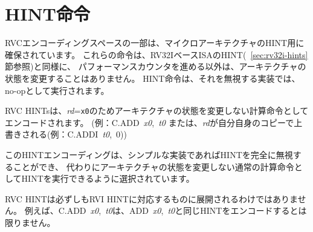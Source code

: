 \section{HINT命令}
\label{sec:rvc-hints}

\begin{comment}
A portion of the RVC encoding space is reserved for microarchitectural HINTs.
Like the HINTs in the RV32I base ISA (see Section~\ref{sec:rv32i-hints}),
these instructions do not modify any architectural state, except for advancing
the {\tt pc} and any applicable performance counters.  HINTs are
executed as no-ops on implementations that ignore them.
\end{comment}
RVCエンコーディングスペースの一部は、マイクロアーキテクチャのHINT用に確保されています。
これらの命令は、RV32IベースISAのHINT(~\ref{sec:rv32i-hints}節参照)と同様に、
パフォーマンスカウンタを進める以外は、アーキテクチャの状態を変更することはありません。
HINT命令は、それを無視する実装では、no-opとして実行されます。

\begin{comment}
RVC HINTs are encoded as computational instructions that do not modify the
architectural state, either because {\em rd}={\tt x0}
(e.g. \mbox{C.ADD {\em x0}, {\em t0}}), or because {\em rd} is overwritten
with a copy of itself (e.g. \mbox{C.ADDI {\em t0}, 0}).
\end{comment}
RVC HINTsは、{\em rd}={\tt x0}のためアーキテクチャの状態を変更しない計算命令としてエンコードされます。
(例：\mbox{C.ADD {\em x0}, {\em t0}} または、{\em rd}が自分自身のコピーで上書きされる(例：\mbox{C.ADDI {\em t0}, 0}))

\begin{commentary}
\begin{comment}
This HINT encoding has been chosen so that simple implementations can ignore
HINTs altogether, and instead execute a HINT as a regular computational
instruction that happens not to mutate the architectural state.
\end{comment}
このHINTエンコーディングは、シンプルな実装であればHINTを完全に無視することができ、
代わりにアーキテクチャの状態を変更しない通常の計算命令としてHINTを実行できるように選択されています。
\end{commentary}

\begin{comment}
RVC HINTs do not necessarily expand to their RVI HINT counterparts.  For
example, \mbox{C.ADD {\em x0}, {\em t0}} might not encode the same HINT
as \mbox{ADD {\em x0}, {\em x0}, {\em t0}}.
\end{comment}
RVC HINTは必ずしもRVI HINTに対応するものに展開されるわけではありません。
例えば、\mbox{C.ADD {\em x0}, {\em t0}}は、\mbox{ADD {\em x0}, {\em t0}}と同じHINTをエンコードするとは限りません。

